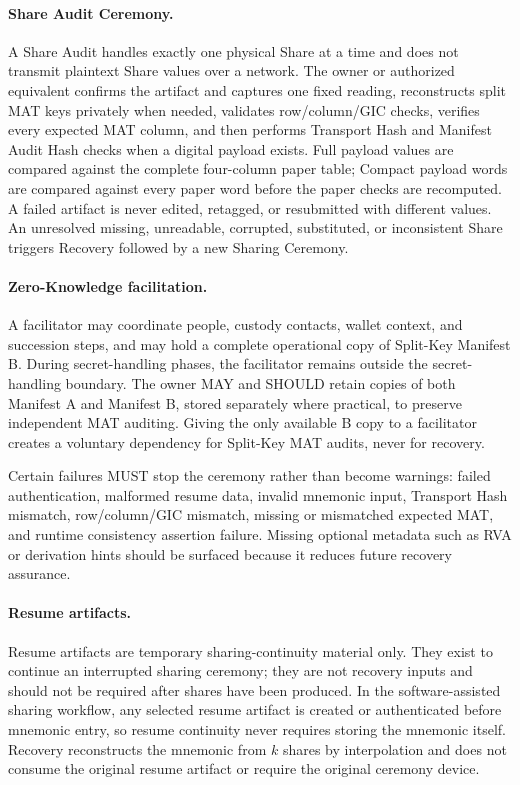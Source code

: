 \documentclass[11pt]{article}
\begin{document}
\paragraph{Share Audit Ceremony.} A Share Audit handles exactly one physical Share at a time and does not transmit plaintext Share values over a network. The owner or authorized equivalent confirms the artifact and captures one fixed reading, reconstructs split MAT keys privately when needed, validates row/column/GIC checks, verifies every expected MAT column, and then performs Transport Hash and Manifest Audit Hash checks when a digital payload exists. Full payload values are compared against the complete four-column paper table; Compact payload words are compared against every paper word before the paper checks are recomputed. A failed artifact is never edited, retagged, or resubmitted with different values. An unresolved missing, unreadable, corrupted, substituted, or inconsistent Share triggers Recovery followed by a new Sharing Ceremony.

\paragraph{Zero-Knowledge facilitation.} A facilitator may coordinate people, custody contacts, wallet context, and succession steps, and may hold a complete operational copy of Split-Key Manifest B. During secret-handling phases, the facilitator remains outside the secret-handling boundary. The owner MAY and SHOULD retain copies of both Manifest A and Manifest B, stored separately where practical, to preserve independent MAT auditing. Giving the only available B copy to a facilitator creates a voluntary dependency for Split-Key MAT audits, never for recovery.

Certain failures MUST stop the ceremony rather than become warnings: failed authentication, malformed resume data, invalid mnemonic input, Transport Hash mismatch, row/column/GIC mismatch, missing or mismatched expected MAT, and runtime consistency assertion failure. Missing optional metadata such as RVA or derivation hints should be surfaced because it reduces future recovery assurance.

\paragraph{Resume artifacts.} Resume artifacts are temporary sharing-continuity material only. They exist to continue an interrupted sharing ceremony; they are not recovery inputs and should not be required after shares have been produced. In the software-assisted sharing workflow, any selected resume artifact is created or authenticated before mnemonic entry, so resume continuity never requires storing the mnemonic itself. Recovery reconstructs the mnemonic from $k$ shares by interpolation and does not consume the original resume artifact or require the original ceremony device.
\end{document}
